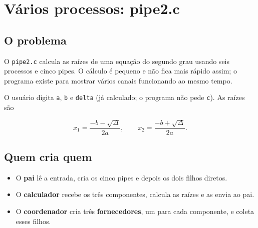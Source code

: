 \documentclass[11pt,a4paper]{article}
\newcommand{\cmd}[1]{\texttt{#1}}
\begin{document}
\section{Vários processos: pipe2.c}

\subsection{O problema}

O \cmd{pipe2.c} calcula as raízes de uma equação do segundo grau usando seis processos e cinco pipes. O cálculo é pequeno e não fica mais rápido assim; o programa existe para mostrar vários canais funcionando ao mesmo tempo.

O usuário digita \cmd{a}, \cmd{b} e \cmd{delta} (já calculado; o programa não pede \cmd{c}). As raízes são

\[
x_1 = \frac{-b - \sqrt{\Delta}}{2a}, \qquad x_2 = \frac{-b + \sqrt{\Delta}}{2a}.
\]

\subsection{Quem cria quem}

\begin{center}
\end{center}

\begin{itemize}
    \item O \textbf{pai} lê a entrada, cria os cinco pipes e depois os dois filhos diretos.
    \item O \textbf{calculador} recebe os três componentes, calcula as raízes e as envia ao pai.
    \item O \textbf{coordenador} cria três \textbf{fornecedores}, um para cada componente, e coleta esses filhos.
\end{itemize}
\end{document}
